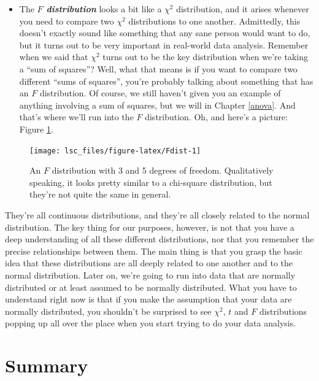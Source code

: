 \documentclass[
  11pt,
  a4paper,
  twoside,symmetric,openright]{book}
\providecommand{\tightlist}{%
  \setlength{\itemsep}{0pt}\setlength{\parskip}{0pt}}
\theoremstyle{break}
\theoremstyle{break}
\begin{document}
\begin{itemize}
\tightlist
\item
  The \textbf{\emph{\(F\) distribution}} looks a bit like a \(\chi^2\) distribution, and it arises whenever you need to compare two \(\chi^2\) distributions to one another. Admittedly, this doesn't exactly sound like something that any sane person would want to do, but it turns out to be very important in real-world data analysis. Remember when we said that \(\chi^2\) turns out to be the key distribution when we're taking a ``sum of squares''? Well, what that means is if you want to compare two different ``sums of squares'', you're probably talking about something that has an \(F\) distribution. Of course, we still haven't given you an example of anything involving a sum of squares, but we will in Chapter \ref{anova}. And that's where we'll run into the \(F\) distribution. Oh, and here's a picture: Figure \ref{fig:Fdist}.
\end{itemize}

\begin{figure}

{\centering \texttt{[image: lsc\_files/figure-latex/Fdist-1]} 

}

\caption{An $F$ distribution with 3 and 5 degrees of freedom. Qualitatively speaking, it looks pretty similar to a chi-square distribution, but they're not quite the same in general.}\label{fig:Fdist}
\end{figure}

They're all continuous distributions, and they're all closely related to the normal distribution. The key thing for our purposes, however, is not that you have a deep understanding of all these different distributions, nor that you remember the precise relationships between them. The main thing is that you grasp the basic idea that these distributions are all deeply related to one another and to the normal distribution. Later on, we're going to run into data that are normally distributed or at least assumed to be normally distributed. What you have to understand right now is that if you make the assumption that your data are normally distributed, you shouldn't be surprised to see \(\chi^2\), \(t\) and \(F\) distributions popping up all over the place when you start trying to do your data analysis.

\section{Summary}\label{summary-3}
\end{document}
